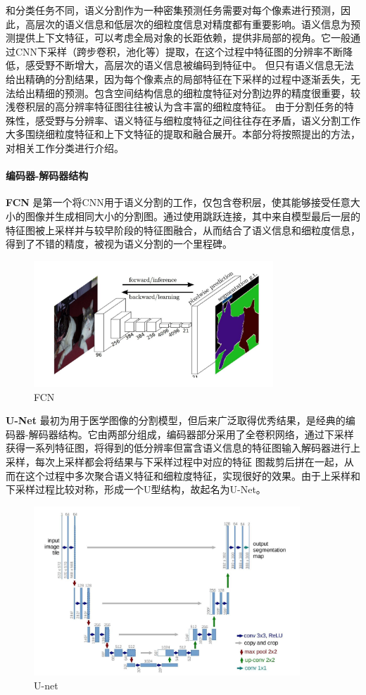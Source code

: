 \documentclass[11pt]{article}
\begin{document}
和分类任务不同，语义分割作为一种密集预测任务需要对每个像素进行预测，因此，高层次的语义信息和低层次的细粒度信息对精度都有重要影响。语义信息为预测提供上下文特征，可以考虑全局对象的长距依赖，提供非局部的视角。它一般通过CNN下采样（跨步卷积，池化等）提取，在这个过程中特征图的分辨率不断降低，感受野不断增大，高层次的语义信息被编码到特征中。
但只有语义信息无法给出精确的分割结果，因为每个像素点的局部特征在下采样的过程中逐渐丢失，无法给出精细的预测。包含空间结构信息的细粒度特征对分割边界的精度很重要，较浅卷积层的高分辨率特征图往往被认为含丰富的细粒度特征。
由于分割任务的特殊性，感受野与分辨率、语义特征与细粒度特征之间往往存在矛盾，语义分割工作大多围绕细粒度特征和上下文特征的提取和融合展开。本部分将按照提出的方法，对相关工作分类进行介绍。


\paragraph{编码器-解码器结构}
\textbf{FCN}\cite{ref1} 是第一个将CNN用于语义分割的工作，仅包含卷积层，使其能够接受任意大小的图像并生成相同大小的分割图。通过使用跳跃连接，其中来自模型最后一层的特征图被上采样并与较早阶段的特征图融合，从而结合了语义信息和细粒度信息，得到了不错的精度，被视为语义分割的一个里程碑。
\begin{figure}[H]
    \centering
    \includegraphics[width=9cm]{fig1.jpg}
    \caption{FCN\cite{ref1}}
\end{figure}

\textbf{U-Net}\cite{ref3} 最初为用于医学图像的分割模型，但后来广泛取得优秀结果，是经典的编码器-解码器结构。它由两部分组成，编码器部分采用了全卷积网络，通过下采样获得一系列特征图，将得到的低分辨率但富含语义信息的特征图输入解码器进行上采样，每次上采样都会将结果与下采样过程中对应的特征
图裁剪后拼在一起，从而在这个过程中多次聚合语义特征和细粒度特征，实现很好的效果。由于上采样和下采样过程比较对称，形成一个U型结构，故起名为U-Net。

\begin{figure}[H]
    \centering
    \includegraphics[width=10cm]{fig2.jpg}
    \caption{U-net\cite{2021INet}}
\end{figure}
\end{document}
